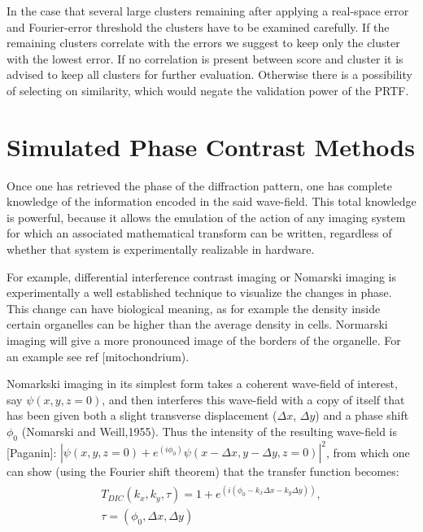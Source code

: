 In the case that several large clusters remaining after applying a real-space error and Fourier-error threshold the clusters have to be examined carefully. If the remaining clusters correlate with the errors we suggest to keep only the cluster with the lowest error. If no correlation is present between score and cluster it is advised to keep all clusters for further evaluation. Otherwise there is a possibility of selecting on similarity, which would negate the validation power of the PRTF.

 
\section{Simulated Phase Contrast Methods}
Once one has retrieved the phase of the diffraction pattern, one has complete knowledge of the information encoded in the said wave-field. This total knowledge is powerful, because it allows the emulation of the action of any imaging system for which an associated mathematical transform can be written, regardless of whether that system is experimentally realizable in hardware.

For example, differential interference contrast imaging or Nomarski imaging is experimentally a well established technique to visualize the changes in phase. This change can have biological meaning, as for example the density inside certain organelles can be higher than the average density in cells. Normarski imaging will give a more pronounced image of the borders of the organelle. For an example see ref [mitochondrium). 

Nomarkski imaging in its simplest form takes a coherent wave-field of interest, say $\psi(x,y,z = 0)$, and then interferes this wave-field with a copy of itself that has been given both a slight transverse displacement ($\Delta x$, $\Delta y$) and a phase shift $\phi_0$ (Nomarski and Weill,1955). Thus the intensity of the resulting wave-field is [Paganin]:
$|\psi(x,y,z=0)+ e^{(i\phi_0)} \psi(x - \Delta x,y - \Delta y,z=0) |^2$, from which one can show (using the Fourier shift theorem) that the transfer function becomes:
\begin{equation}
\begin{aligned}
\begin{split}
T_{DIC}(k_x, k_y, \tau) = 1 + e^{(i(\phi_0 - k_x \Delta x - k_y \Delta y))},\\
\tau = (\phi_0, \Delta x, \Delta y)
\end{split}
\end{aligned}
\end{equation}

